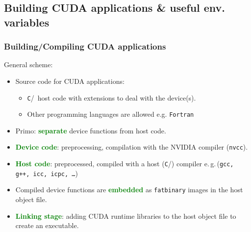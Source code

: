 \subsection{Building CUDA applications \& useful env. variables} 
\begin{frame}
   \frametitle{Building/Compiling CUDA applications}
      General scheme:
      \begin{itemize}
         \item Source code for CUDA applications:
            \begin{itemize}		 
	       \item \texttt{C}/\CC\ host code with extensions to deal with the device(s). 
	       \item Other programming languages are allowed e.g. \texttt{Fortran} 
            \end{itemize}	
         \item Primo: \textbf{\textcolor{green}{separate}} device functions from host code.
         \item \textbf{\textcolor{green}{Device code}}: preprocessing, compilation 
	       with the NVIDIA compiler (\texttt{nvcc}).		 
         \item \textbf{\textcolor{green}{Host code}}: preprocessed, compiled with a host (\texttt{C}/\CC) 
	       compiler e.\,g.\,(\texttt{gcc, g++, icc, icpc, \ldots})
	 \item Compiled device functions are \textbf{\textcolor{green}{embedded}} as \texttt{fatbinary} 
	       images in the host object file.
         \item \textbf{\textcolor{green}{Linking stage}}: adding CUDA runtime libraries 
	       to the host object file to create an executable.
      \end{itemize}		      
\end{frame}


